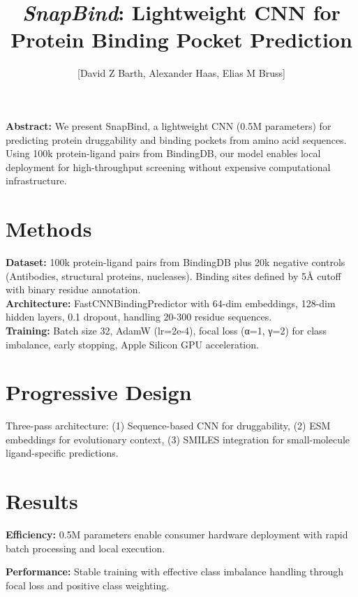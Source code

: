 \documentclass[11pt,a4paper]{article}
\title{\vspace{-1cm}\textit{SnapBind}: Lightweight CNN for Protein Binding Pocket Prediction}
\author{[David Z Barth, Alexander Haas, Elias M Bruss]}
\date{}
\begin{document}
\maketitle
\vspace{-0.5cm}

\begin{multicols}{2}

\noindent \textbf{Abstract:} We present SnapBind, a lightweight CNN (0.5M parameters) for predicting protein druggability and binding pockets from amino acid sequences. Using 100k protein-ligand pairs from BindingDB, 
our model enables local deployment for high-throughput screening without expensive computational infrastructure.

\section{Methods}

\quad \textbf{Dataset:} 100k protein-ligand pairs from BindingDB plus 20k negative controls (Antibodies, structural proteins, nucleases). Binding sites defined by 5Å cutoff with binary residue annotation. \\

\noindent \quad \textbf{Architecture:} FastCNNBindingPredictor with 64-dim embeddings, 128-dim hidden layers, 0.1 dropout, handling 20-300 residue sequences. \\

\noindent \quad \textbf{Training:} Batch size 32, AdamW (lr=2e-4), focal loss (α=1, γ=2) for class imbalance, early stopping, Apple Silicon GPU acceleration.

\section{Progressive Design}

Three-pass architecture: (1) Sequence-based CNN for druggability, (2) ESM embeddings for evolutionary context, (3) SMILES integration for small-molecule ligand-specific predictions.

\section{Results}

\textbf{Efficiency:} 0.5M parameters enable consumer hardware deployment with rapid batch processing and local execution.

\textbf{Performance:} Stable training with effective class imbalance handling through focal loss and positive class weighting. 


\end{multicols}
\end{document}
